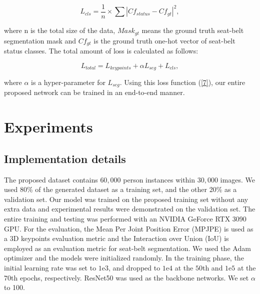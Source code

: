 \documentclass[letterpaper]{article} %
\begin{document}
\begin{equation} \label{6}
{{L}_{cls} = \frac{1}{n}\times{\sum\left|{Cf}_{status} - {Cf}_{gt}\right|}^2},
\end{equation}

\noindent where n is the total size of the data, ${Mask}_{gt}$ means the ground truth seat-belt segmentation mask and ${Cf}_{gt}$ is the ground truth one-hot vector of seat-belt status classes.
The total amount of loss is calculated as follows:

\begin{equation} \label{7}
{{L}_{total} = {L}_{keypoints} + \alpha{L}_{seg} + {L}_{cls}},
\end{equation}

\noindent where $\alpha$ is a hyper-parameter for ${L}_{seg}$. Using this loss function (\ref{7}), our entire proposed network can be trained in an end-to-end manner.

\section{Experiments}
\subsection{Implementation details}
 The proposed dataset contains $60,000$ person instances within $30,000$ images. We used 80\% of the generated dataset as a training set, and the other 20\% as a validation set. Our model was trained on the proposed training set without any extra data and experimental results were demonstrated on the validation set. The entire training and testing was performed with an NVIDIA GeForce RTX 3090 GPU. For the evaluation, the Mean Per Joint Position Error (MPJPE) is used as a 3D keypoints evaluation metric and the Interaction over Union (IoU) is employed as an evaluation metric for seat-belt segmentation. We used the Adam optimizer \cite{kingma2014adam} and the models were initialized randomly. In the training phase, the initial learning rate was set to $1$e\textminus$3$, and dropped to $1$e\textminus$4$ at the $50$th and $1$e\textminus$5$ at the $70$th epochs, respectively. ResNet50 \cite{he2016identity} was used as the backbone networks. We set $\alpha$ to 100.
\end{document}
